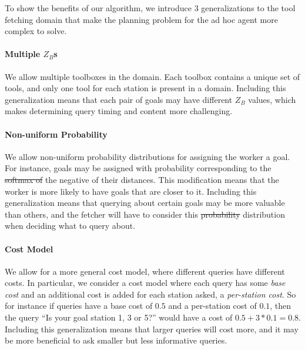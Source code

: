 \documentclass[letterpaper]{article}
\providecommand{\DIFaddtex}[1]{{\protect\color{blue}\uwave{#1}}} %
\providecommand{\DIFdeltex}[1]{{\protect\color{red}\sout{#1}}}                      %
\providecommand{\DIFaddbegin}{} %
\providecommand{\DIFaddend}{} %
\providecommand{\DIFdelbegin}{} %
\providecommand{\DIFdelend}{} %
\providecommand{\DIFadd}[1]{\texorpdfstring{\DIFaddtex{#1}}{#1}} %
\providecommand{\DIFdel}[1]{\texorpdfstring{\DIFdeltex{#1}}{}} %
\newcommand{\DIFscaledelfig}{0.5}
\newlength{\DIFdelgraphicswidth} %
\newlength{\DIFdelgraphicsheight} %
\newcommand{\DIFaddincludegraphics}[2][]{{\color{blue}\fbox{\DIFOincludegraphics[#1]{#2}}}} %
\newcommand{\DIFdelincludegraphics}[2][]{%
\sbox{\DIFdelgraphicsbox}{\DIFOincludegraphics[#1]{#2}}%
\settoboxwidth{\DIFdelgraphicswidth}{\DIFdelgraphicsbox} %
\settoboxtotalheight{\DIFdelgraphicsheight}{\DIFdelgraphicsbox} %
\scalebox{\DIFscaledelfig}{%
\parbox[b]{\DIFdelgraphicswidth}{\usebox{\DIFdelgraphicsbox}\\[-\baselineskip] \rule{\DIFdelgraphicswidth}{0em}}\llap{\resizebox{\DIFdelgraphicswidth}{\DIFdelgraphicsheight}{%
\setlength{\unitlength}{\DIFdelgraphicswidth}%
\begin{picture}(1,1)%
\thicklines\linethickness{2pt} %
{\color[rgb]{1,0,0}\put(0,0){\framebox(1,1){}}}%
{\color[rgb]{1,0,0}\put(0,0){\line( 1,1){1}}}%
{\color[rgb]{1,0,0}\put(0,1){\line(1,-1){1}}}%
\end{picture}%
}\hspace*{3pt}}} %
} %
\DeclareRobustCommand{\DIFaddbegin}{\DIFOaddbegin \let\includegraphics\DIFaddincludegraphics} %
\DeclareRobustCommand{\DIFaddend}{\DIFOaddend \let\includegraphics\DIFOincludegraphics} %
\DeclareRobustCommand{\DIFdelbegin}{\DIFOdelbegin \let\includegraphics\DIFdelincludegraphics} %
\DeclareRobustCommand{\DIFdelend}{\DIFOaddend \let\includegraphics\DIFOincludegraphics} %
\begin{document}
\DIFdelend %
\DIFdelbegin %

\DIFdelend To show the benefits of our algorithm, we introduce 3 generalizations to the tool fetching domain that make the planning problem for the ad hoc agent more complex to solve. 
    \paragraph{Multiple $Z_B$s} We allow multiple toolboxes in the domain. Each toolbox contains a unique set of tools, and only one tool for each station is present in a domain. Including this generalization means that each pair of goals may have different $Z_B$ values, which makes determining query timing and content more challenging. %
    \paragraph{Non-uniform Probability} We allow non-uniform probability distributions for assigning the worker a goal. For instance, goals may be assigned with probability corresponding to the \DIFdelbegin \DIFdel{softmax of }\DIFdelend \DIFaddbegin \DIFadd{Boltzmann distribution over }\DIFaddend the negative of their distances. This modification means that the worker is more likely to have goals that are closer to it. Including this generalization means that querying about certain goals may be more valuable than others, and the fetcher will have to consider this \DIFdelbegin \DIFdel{probability }\DIFdelend distribution when deciding what to query about.
    \paragraph{Cost Model} We allow for a more general cost model, where different queries have different costs. In particular, we consider a cost model where each query has some \emph{base cost} and an additional cost is added for each station asked, a \emph{per-station cost}. So for instance if queries have a base cost of $0.5$ and a per-station cost of $0.1$, then the query ``Is your goal station 1, 3 or 5?'' would have a cost of $0.5 + 3*0.1 = 0.8$. Including this generalization means that larger queries will cost more, and it may be more beneficial to ask smaller but less informative queries.
\end{document}
